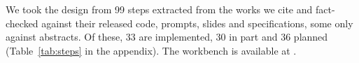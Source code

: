 We took the design from 99 steps extracted from the works we cite and fact-checked against their released code, %
prompts, slides and specifications, some only against abstracts. Of these, 33 are implemented, 30 in part and 36 %
planned (Table~\ref{tab:steps} in the appendix). The workbench is available at .
